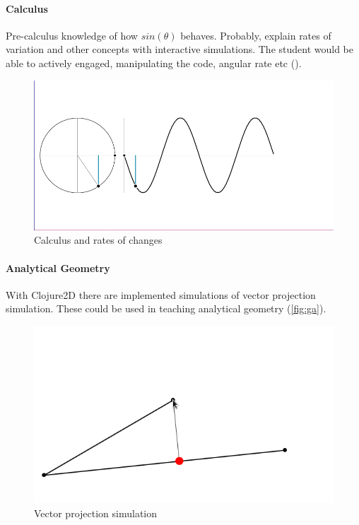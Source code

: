 \documentclass[
12pt,				%
openright,			%
oneside,			%
a4paper,			%
brazil,				%
english,			  %
]{abntex2}
\begin{document}
\paragraph{Calculus}

Pre-calculus knowledge of how $sin(\theta)$ behaves. Probably, explain
rates of variation and other concepts with interactive
simulations. The student would be able to actively engaged, manipulating the
code, angular rate etc ().

\begin{figure}[ht]
  \centering
    \caption{\label{fig:calc} Calculus and rates of changes}
  \includegraphics[width=0.7\linewidth]{Imagens/CA/calc1-is.png}
\end{figure}

\paragraph{Analytical Geometry}

With Clojure2D there are implemented simulations of vector projection
simulation. These could be used in teaching analytical geometry (\autoref{fig:ga}).

\begin{figure}[ht]
  \centering
    \caption{\label{fig:ga} Vector projection simulation}
  \includegraphics[width=0.7\linewidth]{Imagens/CA/GA-is.png}
\end{figure}
\end{document}
